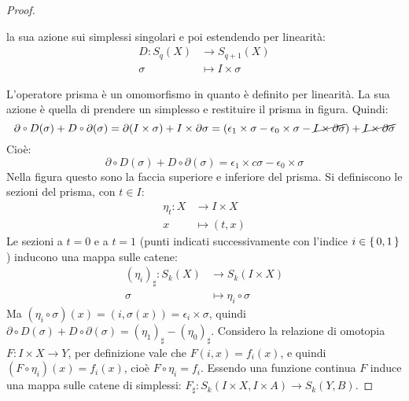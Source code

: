 \begin{proof}
\begin{definition}
    la sua azione sui simplessi singolari e poi estendendo per linearità:
    \begin{align*}
      D \colon S_q(X) & \to S_{q+1}(X) \\
      \sigma & \mapsto I \times \sigma
    \end{align*}
  \end{definition}
  L'operatore prisma è un omomorfismo in quanto è definito per linearità. La sua
  azione è quella di prendere un simplesso e restituire il prisma in figura.
  Quindi:
  \[
    \partial \circ D (\sigma) + D \circ \partial (\sigma) = \partial (I \times \sigma) + I \times \partial \sigma = (\epsilon_1 \times \sigma - \epsilon_0 \times \sigma - \cancel{I \times \partial \sigma})
    + \cancel{I \times \partial \sigma}
  \]
  Cioè:
  \[
    \partial \circ D (\sigma) + D \circ \partial (\sigma) = \epsilon_1 \times c\sigma- \epsilon_0 \times \sigma
  \]
  Nella figura questo sono la faccia superiore e inferiore del prisma.
  Si definiscono le sezioni del prisma, con $ t \in I $:
  \begin{align*}
    \eta_t  \colon X & \to I \times X \\
    x & \mapsto (t,x)
  \end{align*}
  Le sezioni a $ t = 0 $ e a $ t = 1 $ (punti indicati successivamente con
  l'indice $ i \in \set{0,1} $) inducono una mappa sulle catene:
  \begin{align*}
    (\eta_i)_\sharp \colon S_k(X) & \to S_k(I \times X) \\
    \sigma & \mapsto \eta_i \circ \sigma
  \end{align*}
  Ma $ (\eta_i \circ \sigma)(x) = (i, \sigma(x)) = \epsilon_i \times \sigma $, quindi
  $ \partial \circ D (\sigma) + D \circ \partial (\sigma) = (\eta_1)_\sharp - (\eta_0)_\sharp $. Considero la relazione di
  omotopia $ F \colon I \times X \to Y $, per definizione vale che
  $ F(i,x) = f_i(x) $, e quindi $ (F \circ \eta_i)(x) = f_i(x) $, cioè $ F \circ \eta_i = f_i $.
  Essendo una funzione continua $ F $ induce una mappa sulle catene di simplessi:
  $ F_\sharp \colon S_k(I \times X, I \times A) \to S_k(Y,B) $.


\end{proof}
